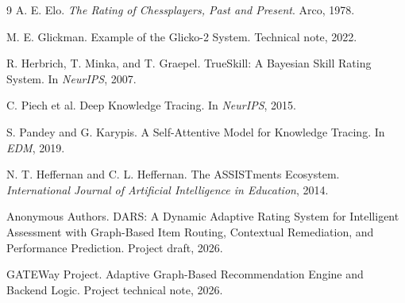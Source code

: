\documentclass[sigconf,nonacm]{acmart}
\begin{document}
\begin{thebibliography}{9}
A. E. Elo. \textit{The Rating of Chessplayers, Past and Present}. Arco, 1978.

M. E. Glickman. Example of the Glicko-2 System. Technical note, 2022.

R. Herbrich, T. Minka, and T. Graepel. TrueSkill: A Bayesian Skill Rating System. In \textit{NeurIPS}, 2007.

C. Piech et al. Deep Knowledge Tracing. In \textit{NeurIPS}, 2015.

S. Pandey and G. Karypis. A Self-Attentive Model for Knowledge Tracing. In \textit{EDM}, 2019.

N. T. Heffernan and C. L. Heffernan. The ASSISTments Ecosystem. \textit{International Journal of Artificial Intelligence in Education}, 2014.

Anonymous Authors. DARS: A Dynamic Adaptive Rating System for Intelligent Assessment with Graph-Based Item Routing, Contextual Remediation, and Performance Prediction. Project draft, 2026.

GATEWay Project. Adaptive Graph-Based Recommendation Engine and Backend Logic. Project technical note, 2026.
\end{thebibliography}
\end{document}
